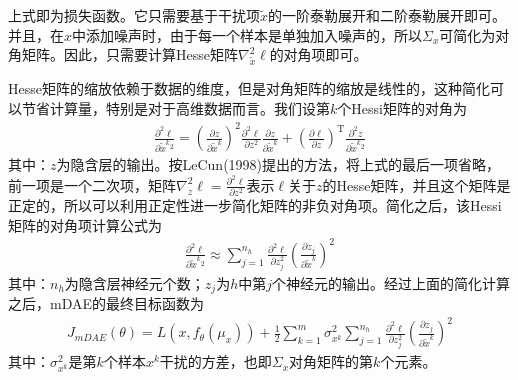         上式即为损失函数。它只需要基于干扰项$\tilde{x}$的一阶泰勒展开和二阶泰勒展开即可。并且，在$x$中添加噪声时，由于每一个样本是单独加入噪声的，所以$\Sigma_x$可简化为对角矩阵。因此，只需要计算Hesse矩阵$\nabla_{\tilde{x}}^2 \ell$的对角项即可。
        \par
        Hesse矩阵的缩放依赖于数据的维度，但是对角矩阵的缩放是线性的，这种简化可以节省计算量，特别是对于高维数据而言。我们设第$k$个Hessi矩阵的对角为
        \begin{align*}
        \frac{\partial ^2\ell}{\partial \tilde{x}^k{}^2} = \left( \frac{\partial z}{\partial \tilde{x}^k} \right) ^2 \frac{\partial ^2\ell}{\partial z^2} \frac{\partial z}{\partial \tilde{x}^k} +  \left( \frac{\partial \ell}{\partial z} \right) ^\mathrm{T}\frac{\partial ^2z}{\partial \tilde{x}^k{}^2}
        \end{align*}
        其中：$z$为隐含层的输出。按LeCun(1998)提出的方法，将上式的最后一项省略，前一项是一个二次项，矩阵$\nabla_z^2\ell = \frac{\partial ^2\ell}{\partial z^2}$表示$\ell$关于$z$的Hesse矩阵，并且这个矩阵是正定的，所以可以利用正定性进一步简化矩阵的非负对角项。简化之后，该Hessi矩阵的对角项计算公式为
        \begin{align*}
        \frac{\partial ^2\ell}{\partial \tilde{x}^k{}^2} \approx \sum_{j=1}^{n_h}\frac{\partial ^2 \ell}{\partial z_j^2} \left( \frac{\partial z_j}{\partial \tilde{x}^k} \right) ^2
        \end{align*}
        其中：$n_h$为隐含层神经元个数；$z_j$为$h$中第$j$个神经元的输出。经过上面的简化计算之后，mDAE的最终目标函数为
        \begin{align*}
        J_{mDAE}(\theta) = L(x,f_\theta(\mu_x)) + \frac{1}{2}\sum_{k=1}^m \sigma_{x^k}^2 \sum_{j=1}^{n_h}\frac{\partial ^2 \ell}{\partial z_j^2} \left( \frac{\partial z_j}{\partial \tilde{x}^k} \right) ^2
        \end{align*}
        其中：$\sigma_{x^k}^2$是第$k$个样本$x^k$干扰的方差，也即$\Sigma_x$对角矩阵的第$k$个元素。

